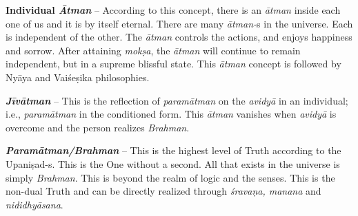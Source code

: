 \textbf{Individual \textit{Ātman}} – According to this concept, there is an \textit{ātman} inside each one of us and it is by itself eternal. There are many \textit{ātman-}s in the universe. Each is independent of the other. The \textit{ātman} controls the actions, and enjoys happiness and sorrow. After attaining \textit{mokṣa}, the \textit{ātman} will continue to remain independent, but in a supreme blissful state. This \textit{ātman} concept is followed by Nyāya and Vaiśeṣika philosophies.

\textit{\textbf{Jīvātman}} – This is the reflection of \textit{paramātman} on the \textit{avidyā} in an individual; i.e., \textit{paramātman} in the conditioned form. This \textit{ātman} vanishes when \textit{avidyā} is overcome and the person realizes \textit{Brahman}.

\textbf{\textit{Paramātman/Brahman}} – This is the highest level of Truth according to the Upaniṣad-s. This is the One without a second. All that exists in the universe is simply \textit{Brahman}. This is beyond the realm of logic and the senses. This is the non-dual Truth and can be directly realized through \textit{śravaṇa, manana} and \textit{nididhyāsana}.

